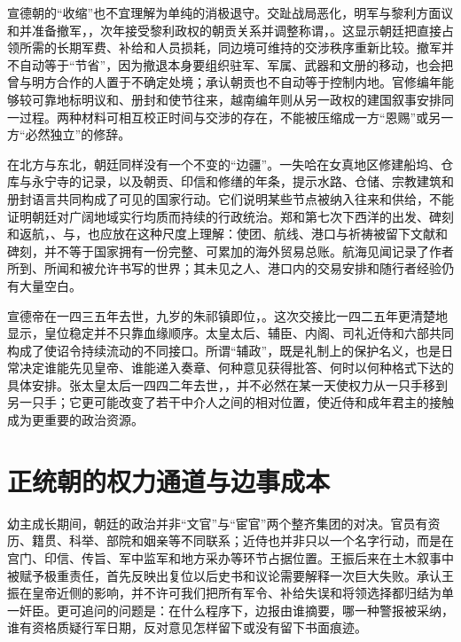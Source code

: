 宣德朝的“收缩”也不宜理解为单纯的消极退守。交趾战局恶化，明军与黎利方面议和并准备撤军，，次年接受黎利政权的朝贡关系并调整称谓，。这显示朝廷把直接占领所需的长期军费、补给和人员损耗，同边境可维持的交涉秩序重新比较。撤军并不自动等于“节省”，因为撤退本身要组织驻军、军属、武器和文册的移动，也会把曾与明方合作的人置于不确定处境；承认朝贡也不自动等于控制内地。官修编年能够较可靠地标明议和、册封和使节往来，越南编年则从另一政权的建国叙事安排同一过程。两种材料可相互校正时间与交涉的存在，不能被压缩成一方“恩赐”或另一方“必然独立”的修辞。

在北方与东北，朝廷同样没有一个不变的“边疆”。一失哈在女真地区修建船坞、仓库与永宁寺的记录，以及朝贡、印信和修缮的年条，提示水路、仓储、宗教建筑和册封语言共同构成了可见的国家行动。它们说明某些节点被纳入往来和供给，不能证明朝廷对广阔地域实行均质而持续的行政统治。郑和第七次下西洋的出发、碑刻和返航，、与，也应放在这种尺度上理解：使团、航线、港口与祈祷被留下文献和碑刻，并不等于国家拥有一份完整、可累加的海外贸易总账。航海见闻记录了作者所到、所闻和被允许书写的世界；其未见之人、港口内的交易安排和随行者经验仍有大量空白。

宣德帝在一四三五年去世，九岁的朱祁镇即位，。这次交接比一四二五年更清楚地显示，皇位稳定并不只靠血缘顺序。太皇太后、辅臣、内阁、司礼近侍和六部共同构成了使诏令持续流动的不同接口。所谓“辅政”，既是礼制上的保护名义，也是日常决定谁能先见皇帝、谁能递入奏章、何种意见获得批答、何时以何种格式下达的具体安排。张太皇太后一四四二年去世，，并不必然在某一天使权力从一只手移到另一只手；它更可能改变了若干中介人之间的相对位置，使近侍和成年君主的接触成为更重要的政治资源。

\section{正统朝的权力通道与边事成本}

幼主成长期间，朝廷的政治并非“文官”与“宦官”两个整齐集团的对决。官员有资历、籍贯、科举、部院和姻亲等不同联系；近侍也并非只以一个名字行动，而是在宫门、印信、传旨、军中监军和地方采办等环节占据位置。王振后来在土木叙事中被赋予极重责任，首先反映出复位以后史书和议论需要解释一次巨大失败。承认王振在皇帝近侧的影响，并不许可我们把所有军令、补给失误和将领选择都归结为单一奸臣。更可追问的问题是：在什么程序下，边报由谁摘要，哪一种警报被采纳，谁有资格质疑行军日期，反对意见怎样留下或没有留下书面痕迹。

